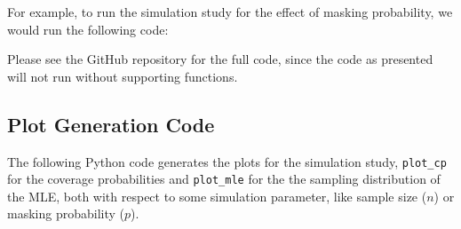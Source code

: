 \documentclass[
]{article}
\newenvironment{Shaded}{\begin{snugshade}}{\end{snugshade}}
\newcommand{\CommentTok}[1]{\textcolor[rgb]{0.56,0.35,0.01}{\textit{#1}}}
\newcommand{\DataTypeTok}[1]{\textcolor[rgb]{0.13,0.29,0.53}{#1}}
\newcommand{\FloatTok}[1]{\textcolor[rgb]{0.00,0.00,0.81}{#1}}
\newcommand{\KeywordTok}[1]{\textcolor[rgb]{0.13,0.29,0.53}{\textbf{#1}}}
\newcommand{\NormalTok}[1]{#1}
\newcommand{\OperatorTok}[1]{\textcolor[rgb]{0.81,0.36,0.00}{\textbf{#1}}}
\newcommand{\StringTok}[1]{\textcolor[rgb]{0.31,0.60,0.02}{#1}}
\theoremstyle{definition}
\theoremstyle{plain}
\theoremstyle{definition}
\theoremstyle{definition}
\theoremstyle{definition}
\theoremstyle{definition}
\theoremstyle{remark}
\begin{document}
For example, to run the simulation study for the effect of masking probability,
we would run the following code:

\begin{Shaded}
\end{Shaded}

Please see the GitHub repository for the full code, since the code as presented
will not run without supporting functions.

\hypertarget{app-plot-r}{%
\subsection{Plot Generation Code}\label{app-plot-r}}

The following Python code generates the plots for the simulation study,
\texttt{plot\_cp} for the coverage probabilities and \texttt{plot\_mle} for the
the sampling distribution of the MLE, both with respect to some simulation
parameter, like sample size (\(n\)) or masking probability (\(p\)).
\end{document}
